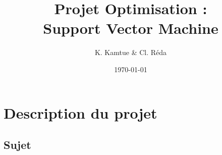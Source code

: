 \documentclass{beamer}
\title{Projet Optimisation :\\Support Vector Machine}
\author{K. Kamtue \& Cl. Réda}
\institute{\textsc{ENS Cachan}}
\date{\today}
\begin{document}
\maketitle
\tableofcontents
\setlength{\parindent}{1cm}

\section{Description du projet}

\subsection{Sujet}

\begin{frame}
\tableofcontents[currentsubsection]
\end{frame}
\end{document}
